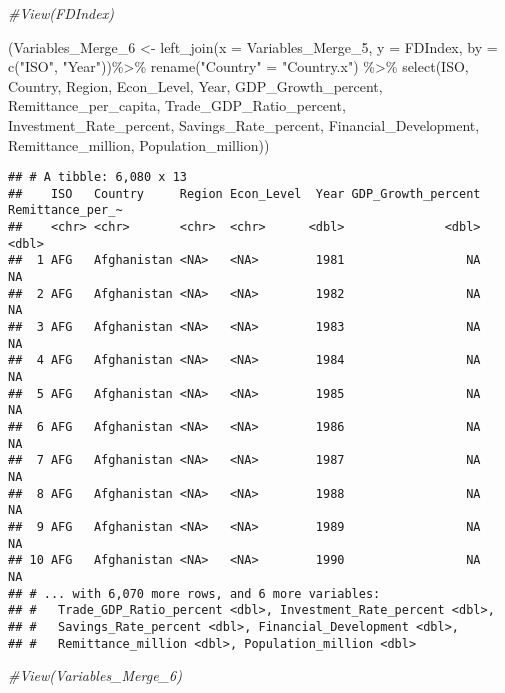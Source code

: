 \documentclass[
]{article}
\newenvironment{Shaded}{\begin{snugshade}}{\end{snugshade}}
\newcommand{\AttributeTok}[1]{\textcolor[rgb]{0.77,0.63,0.00}{#1}}
\newcommand{\CommentTok}[1]{\textcolor[rgb]{0.56,0.35,0.01}{\textit{#1}}}
\newcommand{\FunctionTok}[1]{\textcolor[rgb]{0.00,0.00,0.00}{#1}}
\newcommand{\NormalTok}[1]{#1}
\newcommand{\OtherTok}[1]{\textcolor[rgb]{0.56,0.35,0.01}{#1}}
\newcommand{\SpecialCharTok}[1]{\textcolor[rgb]{0.00,0.00,0.00}{#1}}
\newcommand{\StringTok}[1]{\textcolor[rgb]{0.31,0.60,0.02}{#1}}
\begin{document}
\begin{Shaded}
\begin{Highlighting}[]
\CommentTok{\#View(FDIndex)}



\NormalTok{(Variables\_Merge\_6 }\OtherTok{\textless{}{-}} \FunctionTok{left\_join}\NormalTok{(}\AttributeTok{x =}\NormalTok{ Variables\_Merge\_5, }\AttributeTok{y =}\NormalTok{ FDIndex, }\AttributeTok{by =} \FunctionTok{c}\NormalTok{(}\StringTok{"ISO"}\NormalTok{, }\StringTok{"Year"}\NormalTok{))}\SpecialCharTok{\%\textgreater{}\%}
  \FunctionTok{rename}\NormalTok{(}\StringTok{"Country"} \OtherTok{=} \StringTok{"Country.x"}\NormalTok{) }\SpecialCharTok{\%\textgreater{}\%}
  \FunctionTok{select}\NormalTok{(ISO, Country, Region, Econ\_Level, Year, GDP\_Growth\_percent, Remittance\_per\_capita, Trade\_GDP\_Ratio\_percent, Investment\_Rate\_percent, Savings\_Rate\_percent, Financial\_Development, Remittance\_million, Population\_million))}
\end{Highlighting}
\end{Shaded}

\begin{verbatim}
## # A tibble: 6,080 x 13
##    ISO   Country     Region Econ_Level  Year GDP_Growth_percent Remittance_per_~
##    <chr> <chr>       <chr>  <chr>      <dbl>              <dbl>            <dbl>
##  1 AFG   Afghanistan <NA>   <NA>        1981                 NA               NA
##  2 AFG   Afghanistan <NA>   <NA>        1982                 NA               NA
##  3 AFG   Afghanistan <NA>   <NA>        1983                 NA               NA
##  4 AFG   Afghanistan <NA>   <NA>        1984                 NA               NA
##  5 AFG   Afghanistan <NA>   <NA>        1985                 NA               NA
##  6 AFG   Afghanistan <NA>   <NA>        1986                 NA               NA
##  7 AFG   Afghanistan <NA>   <NA>        1987                 NA               NA
##  8 AFG   Afghanistan <NA>   <NA>        1988                 NA               NA
##  9 AFG   Afghanistan <NA>   <NA>        1989                 NA               NA
## 10 AFG   Afghanistan <NA>   <NA>        1990                 NA               NA
## # ... with 6,070 more rows, and 6 more variables:
## #   Trade_GDP_Ratio_percent <dbl>, Investment_Rate_percent <dbl>,
## #   Savings_Rate_percent <dbl>, Financial_Development <dbl>,
## #   Remittance_million <dbl>, Population_million <dbl>
\end{verbatim}

\begin{Shaded}
\begin{Highlighting}[]
\CommentTok{\#View(Variables\_Merge\_6)}
\end{Highlighting}
\end{Shaded}
\end{document}
